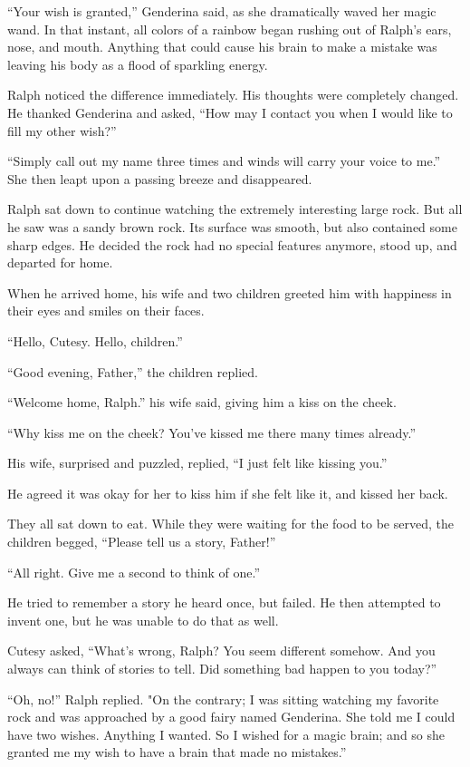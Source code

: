 “Your wish is granted,” Genderina said, as she dramatically waved her magic wand. In that instant, all colors of a rainbow began rushing out of Ralph's ears, nose, and mouth. Anything that could cause his brain to make a mistake was leaving his body as a flood of sparkling energy.

Ralph noticed the difference immediately. His thoughts were completely changed. He thanked Genderina and asked, “How may I contact you when I would like to fill my other wish?”

“Simply call out my name three times and winds will carry your voice to me.” She then leapt upon a passing breeze and disappeared.

Ralph sat down to continue watching the extremely interesting large rock. But all he saw was a sandy brown rock. Its surface was smooth, but also contained some sharp edges. He decided the rock had no special features anymore, stood up, and departed for home.

When he arrived home, his wife and two children greeted him with happiness in their eyes and smiles on their faces.

“Hello, Cutesy. Hello, children.”

“Good evening, Father,” the children replied.

“Welcome home, Ralph.” his wife said, giving him a kiss on the cheek.

“Why kiss me on the cheek? You've kissed me there many times already.”

His wife, surprised and puzzled, replied, “I just felt like kissing you.”

He agreed it was okay for her to kiss him if she felt like it, and kissed her back.

They all sat down to eat. While they were waiting for the food to be served, the children begged, “Please tell us a story, Father!”

“All right. Give me a second to think of one.”

He tried to remember a story he heard once, but failed. He then attempted to invent one, but he was unable to do that as well.

Cutesy asked, “What's wrong, Ralph? You seem different somehow. And you always can think of stories to tell. Did something bad happen to you today?”

“Oh, no!” Ralph replied. "On the contrary; I was sitting watching my favorite rock and was approached by a good fairy named Genderina. She told me I could have two wishes. Anything I wanted. So I wished for a magic brain; and so she granted me my wish to have a brain that made no mistakes.”

